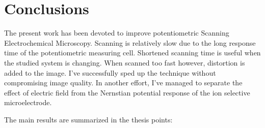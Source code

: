 \chapter{Conclusions}
\pagestyle{plain}
The present work has been devoted to improve potentiometric Scanning Electrochemical Microscopy.
Scanning is relatively slow due to the long response time of the potentiometric measuring cell.
Shortened scanning time is useful when the studied system is changing.
When scanned too fast however, distortion is added to the image.
I've successfully sped up the technique without compromising image quality.
In another effort, I've managed to separate the effect of electric field from the Nernstian potential response of the ion selective microelectrode. 

The main results are summarized in the thesis points:

